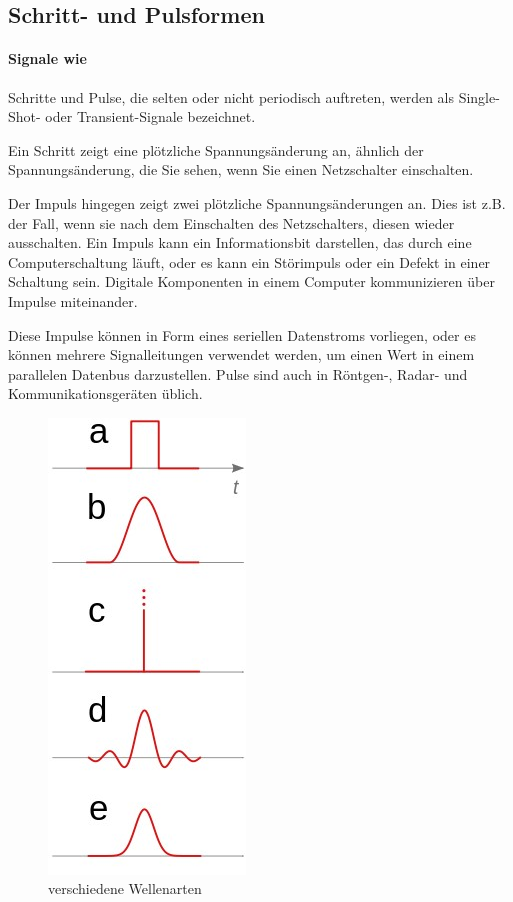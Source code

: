 \documentclass{article}
\begin{document}
\subsection{Schritt- und Pulsformen}
\paragraph{Signale wie}
Schritte und Pulse, die selten oder nicht periodisch auftreten, werden als Single-Shot- oder Transient-Signale bezeichnet. 

Ein Schritt zeigt eine plötzliche Spannungsänderung an, ähnlich der Spannungsänderung, die Sie sehen, wenn Sie einen Netzschalter einschalten.

Der Impuls hingegen zeigt zwei plötzliche Spannungsänderungen an. Dies ist z.B. der Fall, wenn sie nach dem Einschalten des Netzschalters, diesen wieder ausschalten. Ein Impuls kann ein Informationsbit darstellen, das durch eine Computerschaltung läuft, oder es kann ein Störimpuls oder ein Defekt in einer Schaltung sein. Digitale Komponenten in einem Computer kommunizieren über Impulse miteinander. 

Diese Impulse können in Form eines seriellen Datenstroms vorliegen, oder es können mehrere Signalleitungen verwendet werden, um einen Wert in einem parallelen Datenbus darzustellen. Pulse sind auch in Röntgen-, Radar- und Kommunikationsgeräten üblich.\cite{basics}
\begin{figure}[H]
  \includegraphics{"PulseWave.jpg"}
  \caption[\textbf{PulseWave.jpg},  Quelle:https://en.wikipedia.org/wiki/Pulse_(signal_processing) (zuletzt abgerufen: 04.09.2021)]{verschiedene Wellenarten}
\end{figure}
\newline
\end{document}
